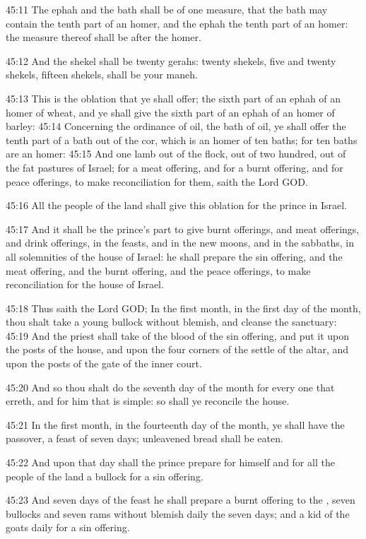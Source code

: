 45:11 The ephah and the bath shall be of one measure, that the bath may contain the tenth part of an homer, and the ephah the tenth part of an homer: the measure thereof shall be after the homer.

45:12 And the shekel shall be twenty gerahs: twenty shekels, five and twenty shekels, fifteen shekels, shall be your maneh.

45:13 This is the oblation that ye shall offer; the sixth part of an ephah of an homer of wheat, and ye shall give the sixth part of an ephah of an homer of barley: 45:14 Concerning the ordinance of oil, the bath of oil, ye shall offer the tenth part of a bath out of the cor, which is an homer of ten baths; for ten baths are an homer: 45:15 And one lamb out of the flock, out of two hundred, out of the fat pastures of Israel; for a meat offering, and for a burnt offering, and for peace offerings, to make reconciliation for them, saith the Lord GOD.

45:16 All the people of the land shall give this oblation for the prince in Israel.

45:17 And it shall be the prince's part to give burnt offerings, and meat offerings, and drink offerings, in the feasts, and in the new moons, and in the sabbaths, in all solemnities of the house of Israel: he shall prepare the sin offering, and the meat offering, and the burnt offering, and the peace offerings, to make reconciliation for the house of Israel.

45:18 Thus saith the Lord GOD; In the first month, in the first day of the month, thou shalt take a young bullock without blemish, and cleanse the sanctuary: 45:19 And the priest shall take of the blood of the sin offering, and put it upon the posts of the house, and upon the four corners of the settle of the altar, and upon the posts of the gate of the inner court.

45:20 And so thou shalt do the seventh day of the month for every one that erreth, and for him that is simple: so shall ye reconcile the house.

45:21 In the first month, in the fourteenth day of the month, ye shall have the passover, a feast of seven days; unleavened bread shall be eaten.

45:22 And upon that day shall the prince prepare for himself and for all the people of the land a bullock for a sin offering.

45:23 And seven days of the feast he shall prepare a burnt offering to the \LORD, seven bullocks and seven rams without blemish daily the seven days; and a kid of the goats daily for a sin offering.

